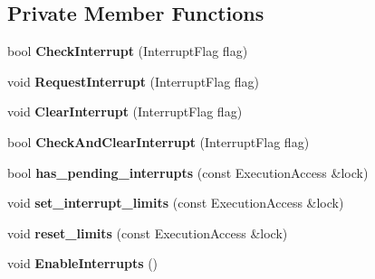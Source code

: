 \subsection*{Private Member Functions}
\begin{DoxyCompactItemize}
\item 
bool {\bfseries Check\+Interrupt} (Interrupt\+Flag flag)\hypertarget{classv8_1_1internal_1_1_stack_guard_af9428f94302f175104f58c9a96f5b8cc}{}\label{classv8_1_1internal_1_1_stack_guard_af9428f94302f175104f58c9a96f5b8cc}

\item 
void {\bfseries Request\+Interrupt} (Interrupt\+Flag flag)\hypertarget{classv8_1_1internal_1_1_stack_guard_af05fd19c43ffe3952d11a9b1be24083e}{}\label{classv8_1_1internal_1_1_stack_guard_af05fd19c43ffe3952d11a9b1be24083e}

\item 
void {\bfseries Clear\+Interrupt} (Interrupt\+Flag flag)\hypertarget{classv8_1_1internal_1_1_stack_guard_a982f280fc152d42e4663ead6a7f846b1}{}\label{classv8_1_1internal_1_1_stack_guard_a982f280fc152d42e4663ead6a7f846b1}

\item 
bool {\bfseries Check\+And\+Clear\+Interrupt} (Interrupt\+Flag flag)\hypertarget{classv8_1_1internal_1_1_stack_guard_a84ac59574dcd181f62f26de9ceac85cd}{}\label{classv8_1_1internal_1_1_stack_guard_a84ac59574dcd181f62f26de9ceac85cd}

\item 
bool {\bfseries has\+\_\+pending\+\_\+interrupts} (const Execution\+Access \&lock)\hypertarget{classv8_1_1internal_1_1_stack_guard_a927406660e7194a0d25727b06b82d232}{}\label{classv8_1_1internal_1_1_stack_guard_a927406660e7194a0d25727b06b82d232}

\item 
void {\bfseries set\+\_\+interrupt\+\_\+limits} (const Execution\+Access \&lock)\hypertarget{classv8_1_1internal_1_1_stack_guard_a9252538c0f9fcb0d1d45c84a58b5b3f7}{}\label{classv8_1_1internal_1_1_stack_guard_a9252538c0f9fcb0d1d45c84a58b5b3f7}

\item 
void {\bfseries reset\+\_\+limits} (const Execution\+Access \&lock)\hypertarget{classv8_1_1internal_1_1_stack_guard_a6ab7cac28a9ccefe96f5c6ef00ab3a2a}{}\label{classv8_1_1internal_1_1_stack_guard_a6ab7cac28a9ccefe96f5c6ef00ab3a2a}

\item 
void {\bfseries Enable\+Interrupts} ()\hypertarget{classv8_1_1internal_1_1_stack_guard_adf003c20fa288a3c4d226b8e11f04931}{}\label{classv8_1_1internal_1_1_stack_guard_adf003c20fa288a3c4d226b8e11f04931}


\end{DoxyCompactItemize}
